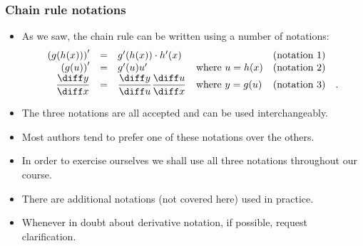 \begin{frame}
\frametitle{Chain rule notations}
\begin{itemize}
\item As we saw, the chain rule can be written using a number of notations:
\[
\begin{array}{rclll}
\left(g(h(x))\right)' &=&g'(h(x))  \cdot  h'(x)&& \text{(notation 1)}  \\ 
\left(g(u)\right)'&=&g'(u) u'&\text{where } u=h(x)& \text{(notation 2)}\\
\displaystyle\frac{\diff y}{\diff x} &=& \displaystyle\frac{\diff y}{\diff u}  \frac{\diff u}{\diff x} &\text{where } y=g(u)& \text{(notation 3)}\quad.\\
\end{array}
\]
\item<2-> The three notations are all accepted and can be used interchangeably.
\item<3-> Most authors tend to prefer one of these notations over the others.
\item<4-> In order to exercise ourselves we shall use all three notations throughout our course.
\item<5-> There are additional notations (not covered here) used in practice.
\item<6-> Whenever in doubt about derivative notation, if possible, request clarification.
\end{itemize}
\end{frame}
